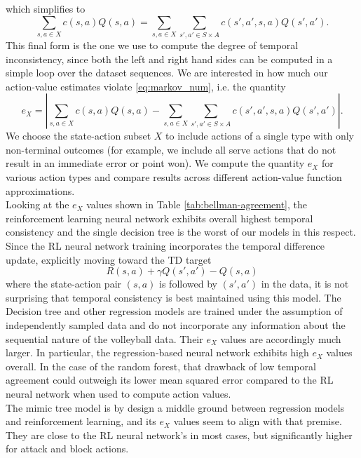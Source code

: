 \documentclass{sfuthesis}
\begin{document}
	which simplifies to
	\begin{equation}
		\sum_{s,a\in X} c(s,a)Q(s,a) = \sum_{s,a\in X} \sum_{s',a'\in S\times A} c(s',a',s,a) Q(s',a').
		\label{eq:markov_num}
	\end{equation}
	This final form is the one we use to compute the degree of temporal inconsistency, since both the left and right hand sides can be computed in a simple loop over the dataset sequences. We are interested in how much our action-value estimates violate \eqref{eq:markov_num}, i.e. the quantity
	\begin{equation}
		e_X = |\sum_{s,a\in X} c(s,a)Q(s,a) - \sum_{s,a\in X} \sum_{s',a'\in S\times A} c(s',a',s,a) Q(s',a') |.
		\label{eq:markov_num2}
	\end{equation}
	We choose the state-action subset $X$ to include actions of a single type with only non-terminal outcomes (for example, we include all serve actions that do not result in an immediate error or point won). We compute the quantity $e_X$ for various action types and compare results across different action-value function approximations.\\
	Looking at the $e_X$ values shown in Table \ref{tab:bellman-agreement}, the reinforcement learning neural network exhibits overall highest temporal consistency and the single decision tree is the worst of our models in this respect. Since the RL neural network training incorporates the temporal difference update, explicitly moving toward the TD target
	$$R(s,a) + \gamma Q(s', a') - Q(s,a)$$
	where the state-action pair $(s,a)$ is followed by $(s',a')$ in the data, it is not surprising that temporal consistency is best maintained using this model. The Decision tree and other regression models are trained under the assumption of independently sampled data and do not incorporate any information about the sequential nature of the volleyball data. Their $e_X$ values are accordingly much larger. In particular, the regression-based neural network exhibits high $e_X$ values overall. In the case of the random forest, that drawback of low temporal agreement could outweigh its lower mean squared error compared to the RL neural network when used to compute action values.\\
	The mimic tree model is by design a middle ground between regression models and reinforcement learning, and its $e_X$ values seem to align with that premise. They are close to the RL neural network's in most cases, but significantly higher for attack and block actions.
	
\end{document}
